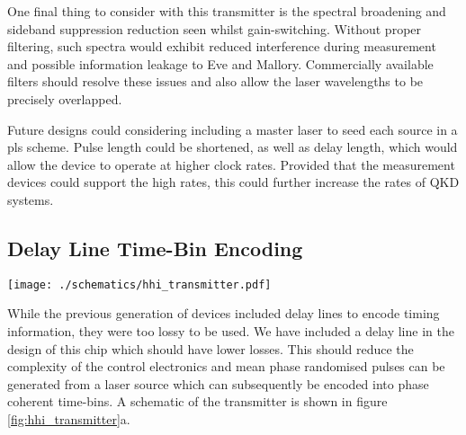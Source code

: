 One final thing to consider with this transmitter is the spectral broadening and sideband suppression reduction seen whilst gain-switching. Without proper filtering, such spectra would exhibit reduced interference during measurement and possible information leakage to Eve and Mallory. Commercially available filters should resolve these issues and also allow the laser wavelengths to be precisely overlapped.

Future designs could considering including a master laser to seed each source in a \ac{pls} scheme. Pulse length could be shortened, as well as delay length, which would allow the device to operate at higher clock rates. Provided that the measurement devices could support the high rates, this could further increase the rates of \ac{QKD} systems.

\subsection{Delay Line Time-Bin Encoding}

\begin{sidewaysfigure}
	\centering
	\texttt{[image: ./schematics/hhi\_transmitter.pdf]}
	\caption[Schematic of the HHI full transmitter]{Schematic of the operating modes of the \acs{hhi} transmitter. \textbf{a} Either a \acs{DBR} or \acs{dfb} laser source provides a phase randomised \acs{wcp} through gain-switching. The pulse is attenuated with an \acs{mzi} for decoy state preparation (Intensity Mod.) and a fast \acs{cipm} can be used if further phase randomisation is required. Basis Enc. switches between the long and short arms of an \acs{amzi}, where superposition is used for X basis states. A \acs{cipm} within the \acs{amzi} then encodes relative phases between early and late time-bins. An \acs{mzi} allows for loss compensation between the long and short arms. \textbf{b} A laser source provides \acs{CW} light which is modulated into pulses (Pulse Mod.). A \acs{cipm} can then provide phase randomisation over the entire state and an \acs{mzi} can encode relative phases. A final \acs{mzi} provides intensity modulation for decoy state preparation.}
	\label{fig:hhi_transmitter}
\end{sidewaysfigure}

While the previous generation of devices included delay lines to encode timing information, they were too lossy to be used. We have included a delay line in the design of this chip which should have lower losses. This should reduce the complexity of the control electronics and mean phase randomised pulses can be generated from a laser source which can subsequently be encoded into phase coherent time-bins. A schematic of the transmitter is shown in figure \ref{fig:hhi_transmitter}a.

